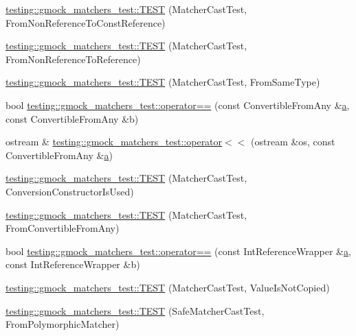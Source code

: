 \begin{DoxyCompactItemize}
\hyperlink{namespacetesting_1_1gmock__matchers__test_a6fd48b8275f96d9d4ee840f0ec590fb1}{testing\+::gmock\+\_\+matchers\+\_\+test\+::\+T\+E\+ST} (Matcher\+Cast\+Test, From\+Non\+Reference\+To\+Const\+Reference)
\item 
\hyperlink{namespacetesting_1_1gmock__matchers__test_ab8d3174b8f1ab799906938ed9984643b}{testing\+::gmock\+\_\+matchers\+\_\+test\+::\+T\+E\+ST} (Matcher\+Cast\+Test, From\+Non\+Reference\+To\+Reference)
\item 
\hyperlink{namespacetesting_1_1gmock__matchers__test_a8f845dd5b1bcdc660926d67dce32b5d2}{testing\+::gmock\+\_\+matchers\+\_\+test\+::\+T\+E\+ST} (Matcher\+Cast\+Test, From\+Same\+Type)
\item 
bool \hyperlink{namespacetesting_1_1gmock__matchers__test_af0b7ba716a9150ff6db37abda4b44fc8}{testing\+::gmock\+\_\+matchers\+\_\+test\+::operator==} (const Convertible\+From\+Any \&\hyperlink{_07copy_08_2_read_camera_model_8m_a551a3d351eadcc0b9b1a2f24f0fb5ea0}{a}, const Convertible\+From\+Any \&b)
\item 
ostream \& \hyperlink{namespacetesting_1_1gmock__matchers__test_a2a2abd1e49c201ae26ed96211d4225eb}{testing\+::gmock\+\_\+matchers\+\_\+test\+::operator$<$$<$} (ostream \&os, const Convertible\+From\+Any \&\hyperlink{_07copy_08_2_read_camera_model_8m_a551a3d351eadcc0b9b1a2f24f0fb5ea0}{a})
\item 
\hyperlink{namespacetesting_1_1gmock__matchers__test_a42e4d7d26704516436281897cb41bb1b}{testing\+::gmock\+\_\+matchers\+\_\+test\+::\+T\+E\+ST} (Matcher\+Cast\+Test, Conversion\+Constructor\+Is\+Used)
\item 
\hyperlink{namespacetesting_1_1gmock__matchers__test_ae51787fccc0f0a27e3725039c6cd48dc}{testing\+::gmock\+\_\+matchers\+\_\+test\+::\+T\+E\+ST} (Matcher\+Cast\+Test, From\+Convertible\+From\+Any)
\item 
bool \hyperlink{namespacetesting_1_1gmock__matchers__test_a33c068c32bf5118e5be92771b146db77}{testing\+::gmock\+\_\+matchers\+\_\+test\+::operator==} (const Int\+Reference\+Wrapper \&\hyperlink{_07copy_08_2_read_camera_model_8m_a551a3d351eadcc0b9b1a2f24f0fb5ea0}{a}, const Int\+Reference\+Wrapper \&b)
\item 
\hyperlink{namespacetesting_1_1gmock__matchers__test_ae99c08c8a815964b61f98a4785cf79b5}{testing\+::gmock\+\_\+matchers\+\_\+test\+::\+T\+E\+ST} (Matcher\+Cast\+Test, Value\+Is\+Not\+Copied)
\item 
\hyperlink{namespacetesting_1_1gmock__matchers__test_a29c04361c022a71711dbf9d3cf2a5050}{testing\+::gmock\+\_\+matchers\+\_\+test\+::\+T\+E\+ST} (Safe\+Matcher\+Cast\+Test, From\+Polymorphic\+Matcher)

\end{DoxyCompactItemize}
